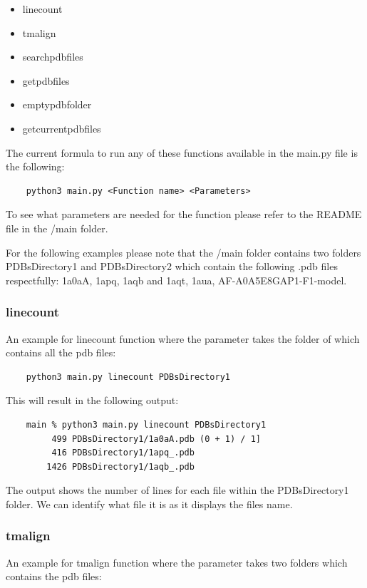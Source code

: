 \documentclass[]{final_report}
\begin{document}
\begin{itemize}
    \item linecount
    \item tmalign
    \item searchpdbfiles
    \item getpdbfiles
    \item emptypdbfolder
    \item getcurrentpdbfiles
\end{itemize}

The current formula to run any of these functions available in the main.py file is the following:

\begin{lstlisting}
    python3 main.py <Function name> <Parameters>
\end{lstlisting}
To see what parameters are needed for the function please refer to the README file in the /main folder.

For the following examples please note that the /main folder contains two folders PDBsDirectory1 and PDBsDirectory2 which contain the following .pdb files respectfully: 1a0aA, 1apq, 1aqb and 1aqt, 1aua, AF-A0A5E8GAP1-F1-model.

\subsubsection{linecount}
An example for linecount function where the parameter takes the folder of which contains all the pdb files:

\begin{lstlisting}
    python3 main.py linecount PDBsDirectory1
\end{lstlisting}

This will result in the following output:

\begin{lstlisting}
    main % python3 main.py linecount PDBsDirectory1             
         499 PDBsDirectory1/1a0aA.pdb (0 + 1) / 1]
         416 PDBsDirectory1/1apq_.pdb
        1426 PDBsDirectory1/1aqb_.pdb   
\end{lstlisting}

The output shows the number of lines for each file within the PDBsDirectory1 folder. We can identify what file it is as it displays the files name.

\clearpage


\subsubsection{tmalign}
An example for tmalign function where the parameter takes two folders which contains the pdb files:
\end{document}
